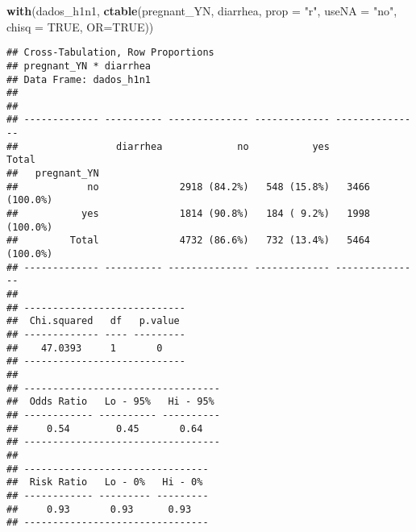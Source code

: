 \documentclass[
]{article}
\newenvironment{Shaded}{\begin{snugshade}}{\end{snugshade}}
\newcommand{\DataTypeTok}[1]{\textcolor[rgb]{0.13,0.29,0.53}{#1}}
\newcommand{\DecValTok}[1]{\textcolor[rgb]{0.00,0.00,0.81}{#1}}
\newcommand{\KeywordTok}[1]{\textcolor[rgb]{0.13,0.29,0.53}{\textbf{#1}}}
\newcommand{\NormalTok}[1]{#1}
\newcommand{\OperatorTok}[1]{\textcolor[rgb]{0.81,0.36,0.00}{\textbf{#1}}}
\newcommand{\OtherTok}[1]{\textcolor[rgb]{0.56,0.35,0.01}{#1}}
\newcommand{\StringTok}[1]{\textcolor[rgb]{0.31,0.60,0.02}{#1}}
\begin{document}
\begin{Shaded}
\end{Shaded}

\begin{Shaded}
\begin{Highlighting}[]
\KeywordTok{with}\NormalTok{(dados_h1n1, }\KeywordTok{ctable}\NormalTok{(pregnant_YN, diarrhea, }\DataTypeTok{prop =} \StringTok{"r"}\NormalTok{, }\DataTypeTok{useNA =} \StringTok{"no"}\NormalTok{, }\DataTypeTok{chisq =} \OtherTok{TRUE}\NormalTok{, }\DataTypeTok{OR=}\OtherTok{TRUE}\NormalTok{))}
\end{Highlighting}
\end{Shaded}

\begin{verbatim}
## Cross-Tabulation, Row Proportions  
## pregnant_YN * diarrhea  
## Data Frame: dados_h1n1  
## 
## 
## ------------- ---------- -------------- ------------- ---------------
##                 diarrhea             no           yes           Total
##   pregnant_YN                                                        
##            no              2918 (84.2%)   548 (15.8%)   3466 (100.0%)
##           yes              1814 (90.8%)   184 ( 9.2%)   1998 (100.0%)
##         Total              4732 (86.6%)   732 (13.4%)   5464 (100.0%)
## ------------- ---------- -------------- ------------- ---------------
## 
## ----------------------------
##  Chi.squared   df   p.value 
## ------------- ---- ---------
##    47.0393     1       0    
## ----------------------------
## 
## ----------------------------------
##  Odds Ratio   Lo - 95%   Hi - 95% 
## ------------ ---------- ----------
##     0.54        0.45       0.64   
## ----------------------------------
## 
## --------------------------------
##  Risk Ratio   Lo - 0%   Hi - 0% 
## ------------ --------- ---------
##     0.93       0.93      0.93   
## --------------------------------
\end{verbatim}
\end{document}
